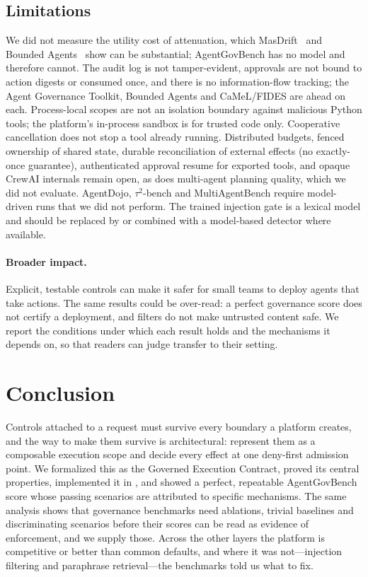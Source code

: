 \subsection{Limitations}
We did not measure the utility cost of attenuation, which MasDrift~\cite{xu2026masdrift} and Bounded Agents~\cite{muruaga2026boundedagents} show can be substantial; AgentGovBench has no model and therefore cannot. The audit log is not tamper-evident, approvals are not bound to action digests or consumed once, and there is no information-flow tracking; the Agent Governance Toolkit, Bounded Agents and CaMeL/FIDES are ahead on each. Process-local scopes are not an isolation boundary against malicious Python tools; the platform's in-process sandbox is for trusted code only. Cooperative cancellation does not stop a tool already running. Distributed budgets, fenced ownership of shared state, durable reconciliation of external effects (no exactly-once guarantee), authenticated approval resume for exported tools, and opaque CrewAI internals remain open, as does multi-agent planning quality, which we did not evaluate. AgentDojo, $\tau^2$-bench and MultiAgentBench require model-driven runs that we did not perform. The trained injection gate is a lexical model and should be replaced by or combined with a model-based detector where available.

\paragraph{Broader impact.} Explicit, testable controls can make it safer for small teams to deploy agents that take actions. The same results could be over-read: a perfect governance score does not certify a deployment, and filters do not make untrusted content safe. We report the conditions under which each result holds and the mechanisms it depends on, so that readers can judge transfer to their setting.

\section{Conclusion}
Controls attached to a request must survive every boundary a platform creates, and the way to make them survive is architectural: represent them as a composable execution scope and decide every effect at one deny-first admission point. We formalized this as the Governed Execution Contract, proved its central properties, implemented it in \method{}, and showed a perfect, repeatable AgentGovBench score whose passing scenarios are attributed to specific mechanisms. The same analysis shows that governance benchmarks need ablations, trivial baselines and discriminating scenarios before their scores can be read as evidence of enforcement, and we supply those. Across the other layers the platform is competitive or better than common defaults, and where it was not---injection filtering and paraphrase retrieval---the benchmarks told us what to fix.

